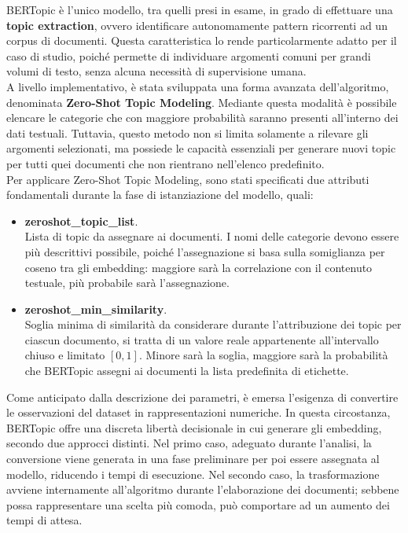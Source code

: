 BERTopic è l'unico modello, tra quelli presi in esame, in grado di effettuare una \textbf{topic extraction}, ovvero identificare autonomamente pattern ricorrenti ad un corpus di documenti. Questa caratteristica lo rende particolarmente adatto per il caso di studio, poiché permette di individuare argomenti comuni per grandi volumi di testo, senza alcuna necessità di supervisione umana. \vspace{7pt} \\
A livello implementativo, è stata sviluppata una forma avanzata dell'algoritmo, denominata \textbf{Zero-Shot Topic Modeling}. Mediante questa modalità è possibile elencare le categorie che con maggiore probabilità saranno presenti all'interno dei dati testuali. Tuttavia, questo metodo non si limita solamente a rilevare gli argomenti selezionati, ma possiede le capacità essenziali per generare nuovi topic per tutti quei documenti che non rientrano nell'elenco predefinito. \vspace{7pt} \\
Per applicare Zero-Shot Topic Modeling, sono stati specificati due attributi fondamentali durante la fase di istanziazione del modello, quali:
\begin{itemize}
    \renewcommand{\labelitemi}{-}
    \item \textbf{zeroshot\_topic\_list}. \\
    Lista di topic da assegnare ai documenti. I nomi delle categorie devono essere più descrittivi possibile, poiché l'assegnazione si basa sulla somiglianza per coseno tra gli embedding: maggiore sarà la correlazione con il contenuto testuale, più probabile sarà l'assegnazione.
    \item \textbf{zeroshot\_min\_similarity}. \\
    Soglia minima di similarità da considerare durante l'attribuzione dei topic per ciascun documento, si tratta di un valore reale appartenente all'intervallo chiuso e limitato $\left[0,1\right]$. Minore sarà la soglia, maggiore sarà la probabilità che BERTopic assegni ai documenti la lista predefinita di etichette.
\end{itemize}
Come anticipato dalla descrizione dei parametri, è emersa l'esigenza di convertire le osservazioni del dataset in rappresentazioni numeriche. In questa circostanza, BERTopic offre una discreta libertà decisionale in cui generare gli embedding, secondo due approcci distinti. Nel primo caso, adeguato durante l'analisi, la conversione viene generata in una fase preliminare per poi essere assegnata al modello, riducendo i tempi di esecuzione. Nel secondo caso, la trasformazione avviene internamente all'algoritmo durante l'elaborazione dei documenti; sebbene possa rappresentare una scelta più comoda, può comportare ad un aumento dei tempi di attesa.
